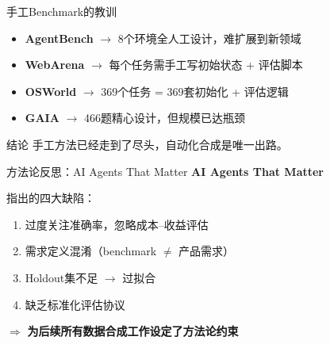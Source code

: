 \documentclass[aspectratio=169, 11pt]{beamer}
\begin{document}
\begin{frame}{手工Benchmark的教训}
\begin{itemize}
    \setlength\itemsep{8pt}
    \item \textbf{AgentBench} $\longrightarrow$ 8个环境全人工设计，难扩展到新领域
    \item \textbf{WebArena} $\longrightarrow$ 每个任务需手工写初始状态 + 评估脚本
    \item \textbf{OSWorld} $\longrightarrow$ 369个任务 = 369套初始化 + 评估逻辑
    \item \textbf{GAIA} $\longrightarrow$ 466题精心设计，但规模已达瓶颈
\end{itemize}

\vspace{16pt}
\begin{block}{结论}
\centering 手工方法已经走到了尽头，\alert{自动化合成是唯一出路}。
\end{block}
\end{frame}

\begin{frame}{方法论反思：AI Agents That Matter}
\textbf{AI Agents That Matter} 

\vspace{10pt}
指出的四大缺陷：
\begin{enumerate}
    \setlength\itemsep{6pt}
    \item 过度关注准确率，忽略\alert{成本--收益}评估
    \item 需求定义混淆（benchmark $\neq$ 产品需求）
    \item Holdout集不足 $\rightarrow$ 过拟合
    \item 缺乏标准化评估协议
\end{enumerate}

\vspace{12pt}
\begin{center}
$\Longrightarrow$ \textbf{为后续所有数据合成工作设定了方法论约束}
\end{center}
\end{frame}
\end{document}
